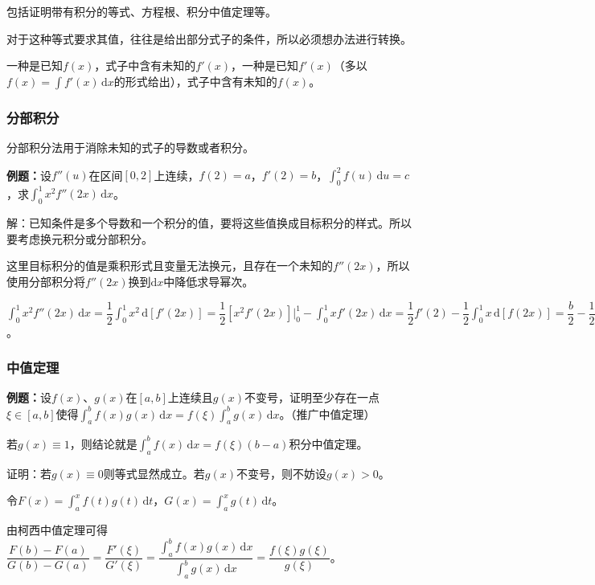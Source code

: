 \documentclass[UTF8, 12pt]{ctexart}
\begin{document}
包括证明带有积分的等式、方程根、积分中值定理等。

对于这种等式要求其值，往往是给出部分式子的条件，所以必须想办法进行转换。

一种是已知$f(x)$，式子中含有未知的$f'(x)$，一种是已知$f'(x)$（多以$f(x)=\int f'(x)\,\textrm{d}x$的形式给出），式子中含有未知的$f(x)$。

\subsubsection{分部积分}

分部积分法用于消除未知的式子的导数或者积分。

\textbf{例题：}设$f''(u)$在区间$[0,2]$上连续，$f(2)=a$，$f'(2)=b$，$\int_0^2f(u)\,\textrm{d}u=c$，求$\int_0^1x^2f''(2x)\,\textrm{d}x$。

解：已知条件是多个导数和一个积分的值，要将这些值换成目标积分的样式。所以要考虑换元积分或分部积分。

这里目标积分的值是乘积形式且变量无法换元，且存在一个未知的$f''(2x)$，所以使用分部积分将$f''(2x)$换到$\textrm{d}x$中降低求导幂次。

$\int_0^1x^2f''(2x)\,\textrm{d}x=\dfrac{1}{2}\int_0^1x^2\,\textrm{d}[f'(2x)]=\dfrac{1}{2}[x^2f'(2x)]\bigg\vert_0^1-\int_0^1xf'(2x)\,\textrm{d}x=\dfrac{1}{2}f'(2)-\dfrac{1}{2}\int_0^1x\,\textrm{d}[f(2x)]=\dfrac{b}{2}-\dfrac{1}{2}[xf(2x)]\bigg\vert_0^1+\dfrac{1}{2}\int_0^1f(2x)\,\textrm{d}x=\dfrac{b}{2}-\dfrac{a}{2}+\dfrac{1}{4}\int_0^2f(u)\,\textrm{d}(u)=-\dfrac{a}{2}+\dfrac{b}{2}+\dfrac{c}{4}$。

\subsubsection{中值定理}

\textbf{例题：}设$f(x)$、$g(x)$在$[a,b]$上连续且$g(x)$不变号，证明至少存在一点$\xi\in[a,b]$使得$\int_a^bf(x)g(x)\,\textrm{d}x=f(\xi)\int_a^bg(x)\,\textrm{d}x$。（推广中值定理）

若$g(x)\equiv1$，则结论就是$\int_a^bf(x)\,\textrm{d}x=f(\xi)(b-a)$积分中值定理。

证明：若$g(x)\equiv0$则等式显然成立。若$g(x)$不变号，则不妨设$g(x)>0$。

令$F(x)=\int_a^xf(t)g(t)\,\textrm{d}t$，$G(x)=\int_a^xg(t)\,\textrm{d}t$。

由柯西中值定理可得$\dfrac{F(b)-F(a)}{G(b)-G(a)}=\dfrac{F'(\xi)}{G'(\xi)}=\dfrac{\int_a^bf(x)g(x)\,\textrm{d}x}{\int_a^bg(x)\,\textrm{d}x}=\dfrac{f(\xi)g(\xi)}{g(\xi)}$。
\end{document}
